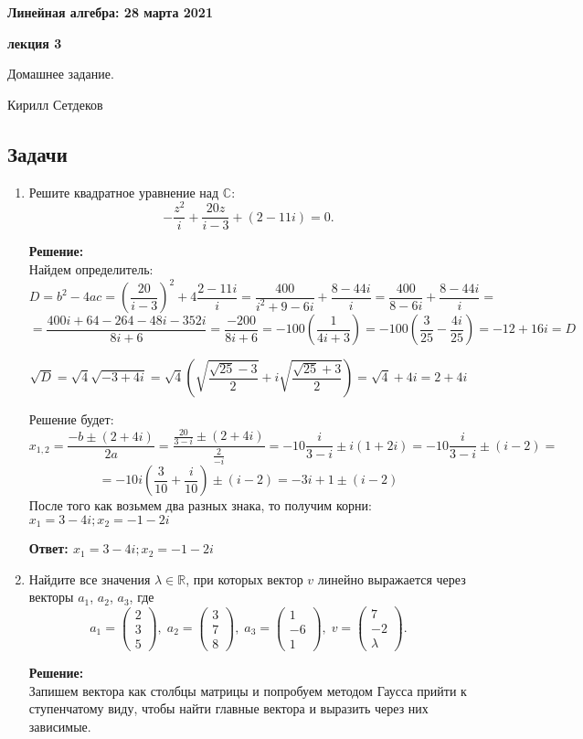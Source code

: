 \documentclass[a4paper,12pt]{article}
\newcounter{z}
\renewcommand{\date}{{\bf 28 марта 2021}}
\newcommand{\HSEhat}{
\vspace*{-0pt}
\noindent
\setcounter{z}{0}


{\bf \phantom{\date}  \large \hfill Линейная алгебра: \hfill \normalsize \date}

\vspace{5 pt}
{\bf \large \hfill  лекция 3\hfill }

\vspace{15 pt}
\centerline{ \large  Домашнее задание.}
\centerline{ \large  Кирилл Сетдеков}



\vspace*{10pt}
\setcounter{z}{0}

}
\begin{document}
\HSEhat


\subsection*{Задачи}

\begin{enumerate}
\item Решите квадратное уравнение над $\mathbb C$:
\[
-\frac{z^2}i + \frac{20z}{i - 3} + (2 - 11i) = 0.
\]

\textbf{Решение:}\\
Найдем определитель:
$$D=b^2-4ac =  (\frac{20}{i - 3})^2+4\frac{2 - 11i}i=\frac{400}{i^2+9-6i}+\frac{8-44i}{i}=\frac{400}{8-6i}+\frac{8-44i}{i}=$$ $$=\frac{400i+64-264-48i-352i}{8i+6}=\frac{-200}{8i+6}=-100 (\frac{1}{4i+3})=-100(\frac{3}{25}-\frac{4i}{25})=-12+16i=D$$

$$\sqrt{D}=\sqrt{4}\sqrt{-3+4i}=\sqrt{4}(\sqrt{\frac{\sqrt{25}-3}{2}}+i\sqrt{\frac{\sqrt{25}+3}{2}})=\sqrt{4}+4i=2+4i$$

Решение будет:
$$x_{1,2} = \frac{-b\pm (2+4i)}{2a}=\frac{\frac{20}{3-i}\pm (2+4i)}{\frac{2}{-i}}=-10\frac{i}{3-i}\pm i (1+2i)=-10\frac{i}{3-i}\pm(i-2) =$$
$$= -10i(\frac{3}{10}+\frac{i}{10})\pm(i-2)=-3i+1 \pm(i-2)$$
После того как возьмем два разных знака, то получим корни:
$x_1 = 3-4i; x_2=-1-2i$


\textbf{Ответ: $x_1 = 3-4i; x_2=-1-2i$}


\item Найдите все значения $\lambda\in \mathbb R$, при которых вектор $v$ линейно выражается через векторы $a_1$, $a_2$, $a_3$, где
\[
a_1 = 
\begin{pmatrix}
{2}\\{3}\\{5}
\end{pmatrix},\;
a_2 = 
\begin{pmatrix}
{3}\\{7}\\{8}
\end{pmatrix},\;
a_3 = 
\begin{pmatrix}
{1}\\{-6}\\{1}
\end{pmatrix},\;
v = 
\begin{pmatrix}
{7}\\{-2}\\{\lambda}
\end{pmatrix}.
\]

\vspace{5pt}
\textbf{Решение:}\\
Запишем вектора как столбцы матрицы и попробуем методом Гаусса прийти к ступенчатому виду, чтобы найти главные вектора и выразить через них зависимые.


\end{enumerate}
\end{document}

